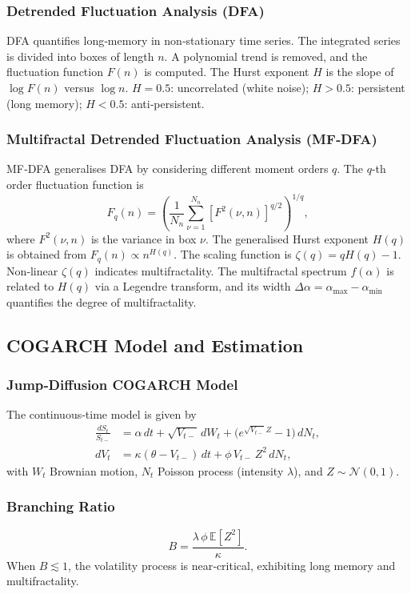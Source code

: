 \subsubsection{Detrended Fluctuation Analysis (DFA)}
DFA quantifies long‑memory in non‑stationary time series. The integrated series is divided into boxes of length \(n\). A polynomial trend is removed, and the fluctuation function \(F(n)\) is computed. The Hurst exponent \(H\) is the slope of \(\log F(n)\) versus \(\log n\).  
\(H = 0.5\): uncorrelated (white noise); \(H > 0.5\): persistent (long memory); \(H < 0.5\): anti‑persistent.

\subsubsection{Multifractal Detrended Fluctuation Analysis (MF‑DFA)}
MF‑DFA generalises DFA by considering different moment orders \(q\). The \(q\)-th order fluctuation function is
\[
F_q(n) = \left( \frac{1}{N_n} \sum_{\nu=1}^{N_n} \left[ F^2(\nu,n) \right]^{q/2} \right)^{1/q},
\]
where \(F^2(\nu,n)\) is the variance in box \(\nu\). The generalised Hurst exponent \(H(q)\) is obtained from \(F_q(n) \propto n^{H(q)}\). The scaling function is \(\zeta(q) = qH(q) - 1\). Non‑linear \(\zeta(q)\) indicates multifractality. The multifractal spectrum \(f(\alpha)\) is related to \(H(q)\) via a Legendre transform, and its width \(\Delta\alpha = \alpha_{\max} - \alpha_{\min}\) quantifies the degree of multifractality.

\subsection{COGARCH Model and Estimation}

\subsubsection{Jump‑Diffusion COGARCH Model}
The continuous‑time model is given by
\begin{align}
\frac{dS_t}{S_{t-}} &= \alpha\,dt + \sqrt{V_{t-}}\,dW_t + \bigl(e^{\sqrt{V_{t-}}Z} - 1\bigr)\,dN_t, \\
dV_t &= \kappa(\theta - V_{t-})\,dt + \phi\, V_{t-}\,Z^2\,dN_t,
\end{align}
with \(W_t\) Brownian motion, \(N_t\) Poisson process (intensity \(\lambda\)), and \(Z\sim\mathcal{N}(0,1)\).

\subsubsection{Branching Ratio}
\[
B = \frac{\lambda\,\phi\,\mathbb{E}[Z^2]}{\kappa}.
\]
When \(B \lesssim 1\), the volatility process is near‑critical, exhibiting long memory and multifractality.

